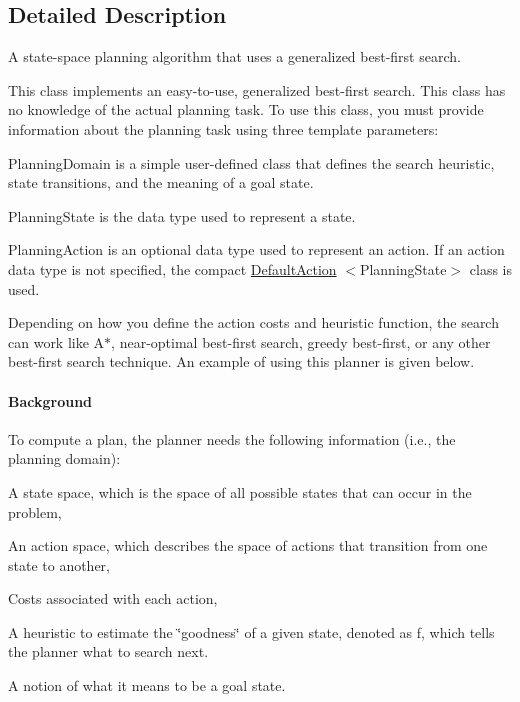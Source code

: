 \subsection{Detailed Description}
A state-\/space planning algorithm that uses a generalized best-\/first search. 

This class implements an easy-\/to-\/use, generalized best-\/first search. This class has no knowledge of the actual planning task. To use this class, you must provide information about the planning task using three template parameters\-:
\begin{DoxyItemize}
\item Planning\-Domain is a simple user-\/defined class that defines the search heuristic, state transitions, and the meaning of a goal state.
\item Planning\-State is the data type used to represent a state.
\item Planning\-Action is an optional data type used to represent an action. If an action data type is not specified, the compact \hyperlink{class_default_action}{Default\-Action} $<$Planning\-State$>$ class is used.
\end{DoxyItemize}

Depending on how you define the action costs and heuristic function, the search can work like A$\ast$, near-\/optimal best-\/first search, greedy best-\/first, or any other best-\/first search technique. An example of using this planner is given below.

\paragraph*{Background }

To compute a plan, the planner needs the following information (i.\-e., the planning domain)\-:
\begin{DoxyItemize}
\item A state space, which is the space of all possible states that can occur in the problem,
\item An action space, which describes the space of actions that transition from one state to another,
\item Costs associated with each action,
\item A heuristic to estimate the \char`\"{}goodness\char`\"{} of a given state, denoted as f, which tells the planner what to search next.
\item A notion of what it means to be a goal state.
\end{DoxyItemize}

